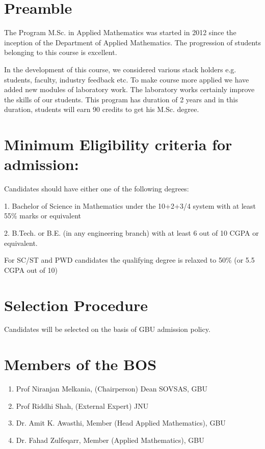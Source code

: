 \documentclass{article}
\begin{document}
\section{Preamble}
The Program M.Sc. in Applied Mathematics was started in 2012 since the inception of the Department of Applied Mathematics. The progression of students belonging to this course is excellent. 

In the development of this course, we considered various stack holders e.g. students, faculty, industry feedback etc. To make course more applied we have added new modules of laboratory work. The laboratory works certainly improve the skills of our students. This program has duration of 2 years and in this duration, students will earn 90 credits to get his M.Sc. degree.

\section*{Minimum Eligibility criteria for admission:}

Candidates should have either one of the following degrees:

1.	Bachelor of Science in Mathematics under the 10+2+3/4 system with at least 55\% marks or equivalent

2.	B.Tech. or B.E. (in any engineering branch) with at least 6 out of 10 CGPA or equivalent.

For SC/ST and PWD candidates the qualifying degree is relaxed to 50\% (or 5.5 CGPA out of 10)

\section*{Selection Procedure}

Candidates will be selected on the basis of GBU admission policy.

{\vfill}

\section{Members of the BOS}
\begin{enumerate}
	\item Prof Niranjan Melkania, (Chairperson) Dean SOVSAS, GBU
	\item Prof Riddhi Shah, (External Expert) JNU
	\item Dr. Amit K. Awasthi, Member (Head Applied Mathematics), GBU
	\item Dr. Fahad Zulfeqarr, Member (Applied Mathematics), GBU
\end{enumerate}
\end{document}

